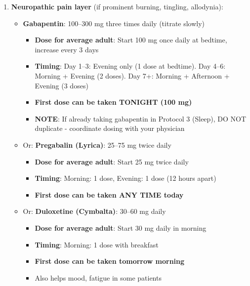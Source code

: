 \begin{enumerate}
    \item \textbf{Neuropathic pain layer} (if prominent burning, tingling, allodynia):
    \begin{itemize}
        \item \textbf{Gabapentin}: 100--300 mg three times daily (titrate slowly)
        \begin{itemize}
            \item \textbf{Dose for average adult}: Start 100 mg once daily at bedtime, increase every 3 days
            \item \textbf{Timing}: Day 1--3: Evening only (1 dose at bedtime). Day 4--6: Morning + Evening (2 doses). Day 7+: Morning + Afternoon + Evening (3 doses)
            \item \textbf{First dose can be taken TONIGHT (100 mg)}
            \item \textbf{NOTE}: If already taking gabapentin in Protocol 3 (Sleep), DO NOT duplicate - coordinate dosing with your physician
        \end{itemize}

        \item Or: \textbf{Pregabalin (Lyrica)}: 25--75 mg twice daily
        \begin{itemize}
            \item \textbf{Dose for average adult}: Start 25 mg twice daily
            \item \textbf{Timing}: Morning: 1 dose, Evening: 1 dose (12 hours apart)
            \item \textbf{First dose can be taken ANY TIME today}
        \end{itemize}

        \item Or: \textbf{Duloxetine (Cymbalta)}: 30--60 mg daily
        \begin{itemize}
            \item \textbf{Dose for average adult}: Start 30 mg daily in morning
            \item \textbf{Timing}: Morning: 1 dose with breakfast
            \item \textbf{First dose can be taken tomorrow morning}
            \item Also helps mood, fatigue in some patients
        \end{itemize}
    \end{itemize}


\end{enumerate}

